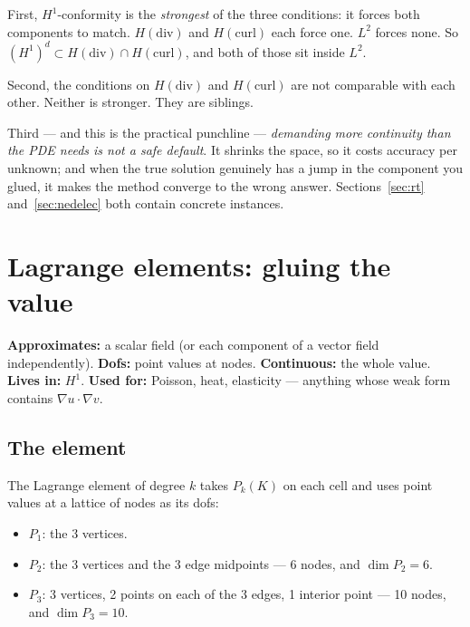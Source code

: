 \documentclass[11pt,a4paper]{article}
\newcommand{\Hdiv}{H(\mathrm{div})}
\newcommand{\Hcurl}{H(\mathrm{curl})}
\begin{document}
First, $H^1$-conformity is the \emph{strongest} of the three conditions: it
forces both components to match. $\Hdiv$ and $\Hcurl$ each force one. $L^2$
forces none. So $(H^1)^d \subset \Hdiv \cap \Hcurl$, and both of those sit
inside $L^2$.

Second, the conditions on $\Hdiv$ and $\Hcurl$ are not comparable with each
other. Neither is stronger. They are siblings.

Third --- and this is the practical punchline --- \emph{demanding more
continuity than the PDE needs is not a safe default}. It shrinks the space, so
it costs accuracy per unknown; and when the true solution genuinely has a jump
in the component you glued, it makes the method converge to the wrong answer.
Sections~\ref{sec:rt} and~\ref{sec:nedelec} both contain concrete instances.

\FloatBarrier

\section{Lagrange elements: gluing the value}

\begin{keypoint}[cH1]
\textbf{Approximates:} a scalar field (or each component of a vector field
independently).\quad
\textbf{Dofs:} point values at nodes.\quad
\textbf{Continuous:} the whole value.\quad
\textbf{Lives in:} $H^1$.\quad
\textbf{Used for:} Poisson, heat, elasticity --- anything whose weak form
contains $\nabla u \cdot \nabla v$.
\end{keypoint}

\subsection{The element}

The Lagrange element of degree $k$ takes $P_k(K)$ on each cell and uses point
values at a lattice of nodes as its dofs:

\begin{itemize}
\item $P_1$: the 3 vertices.
\item $P_2$: the 3 vertices and the 3 edge midpoints --- 6 nodes, and
      $\dim P_2 = 6$.
\item $P_3$: 3 vertices, 2 points on each of the 3 edges, 1 interior point ---
      10 nodes, and $\dim P_3 = 10$.
\end{itemize}
\end{document}
